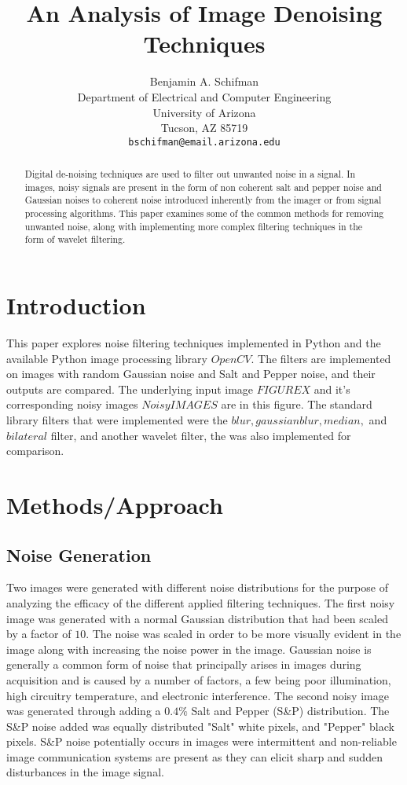 \documentclass{article}
\title{An Analysis of Image Denoising Techniques}
\author{
  Benjamin A. Schifman\\
  Department of Electrical and Computer Engineering\\
  University of Arizona\\
  Tucson, AZ 85719 \\
  \texttt{bschifman@email.arizona.edu} \\
}
\begin{document}
 

\maketitle

\begin{abstract}
  Digital de-noising techniques are used to filter out unwanted noise in a signal. In images, noisy signals are present in the form of non coherent salt and pepper noise and Gaussian noises to coherent noise introduced inherently from the imager or from signal processing algorithms. This paper examines some of the common methods for removing unwanted noise, along with implementing more complex filtering techniques in the form of wavelet filtering. 
\end{abstract}

\section{Introduction}
 This paper explores noise filtering techniques implemented in Python and the available Python image processing library $OpenCV.$ The filters are implemented on images with random Gaussian noise and Salt and Pepper noise, and their outputs are compared. The underlying input image $FIGURE X$ and it's corresponding noisy images $Noisy IMAGES$ are in this figure. The standard library filters that were implemented were the $blur, gaussian blur, median,$ and $bilateral$ filter, and another wavelet filter, the  was also implemented for comparison.

\section{Methods/Approach}
\subsection{Noise Generation}
Two images were generated with different noise distributions for the purpose of analyzing the efficacy of the different applied filtering techniques. The first noisy image was generated with a normal Gaussian distribution that had been scaled by a factor of $10$. The noise was scaled in order to be more visually evident in the image along with increasing the noise power in the image. Gaussian noise is generally a common form of noise that principally arises in images during acquisition and is caused by a number of factors, a few being poor illumination, high circuitry temperature, and electronic interference. The second noisy image was generated through adding a $0.4\%$ Salt and Pepper (S\&P) distribution. The S\&P noise added was equally distributed "Salt" white pixels, and "Pepper" black pixels. S\&P noise potentially occurs in images were intermittent and non-reliable image communication systems are present as they can elicit sharp and sudden disturbances in the image signal.
\end{document}
